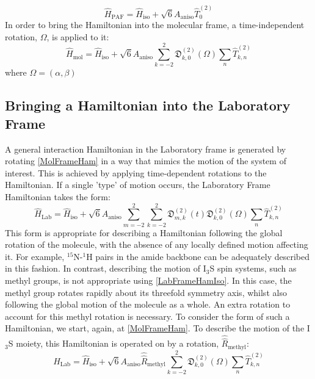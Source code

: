 \begin{equation}
\hat{H}_{\text{PAF}} = \hat{H}_{\text{iso}} + \sqrt{6} A_{\text{aniso}}\hat{T}_0^{(2)}
\end{equation}
In order to bring the Hamiltonian into the molecular frame, a time-independent rotation, $\Omega$, is applied to it: 
\begin{equation}
\label{MolFrameHam}
\hat{H}_{\text{mol}} = \hat{H}_{\text{iso}} + \sqrt{6} A_{\text{aniso}} \sum \limits_{k = -2}^2 \mathfrak{D}_{k,0}^{(2)}(\Omega) \sum \limits_n \hat{T}_{k,n}^{(2)}
\end{equation}
where $\Omega = (\alpha, \beta)$ 
\subsection{Bringing a Hamiltonian into the Laboratory Frame}
A general interaction Hamiltonian in the Laboratory frame is generated by rotating \ref{MolFrameHam} in a way that mimics the motion of the system of interest. This is achieved by applying time-dependent rotations to the Hamiltonian. If a single 'type' of motion occurs, the Laboratory Frame Hamiltonian takes the form:
\begin{equation}
\label{LabFrameHamIso}
\hat{H}_{\text{Lab}} = \hat{H}_{\text{iso}} + \sqrt{6}A_{\text{aniso}} \sum \limits_{m = -2}^2 \sum \limits_{k = -2}^2  \mathfrak{D}_{m,k}^{(2)}(t) \mathfrak{D}_{k,0}^{(2)} (\Omega) \sum_n\hat{T}_{k,n}^{(2)}
\end{equation}
This form is appropriate for describing a Hamiltonian following the global rotation of the molecule, with the absence of any locally defined motion affecting it. For example, $^{15}$N-$^1$H pairs in the amide backbone can be adequately described in this fashion. In contrast, describing the motion of I$_3$S spin systems, such as methyl groups, is not appropriate using \ref{LabFrameHamIso}. In this case, the methyl group rotates rapidly about its threefold symmetry axis, whilst also following the global motion of the molecule as a whole. An extra rotation to account for this methyl rotation is necessary. To consider the form of such a Hamiltonian, we start, again, at \ref{MolFrameHam}. To describe the motion of the I$_3$S moiety, this Hamiltonian is operated on by a rotation, $\hat{\hat{R}}_{\text{methyl}}$: 
\begin{equation}
\hat{H}_{\text{Lab}} = \hat{H}_{\text{iso}} + \sqrt{6} A_{\text{aniso}} \hat{\hat{R}}_{\text{methyl}} \sum \limits_{k = -2}^2 \mathfrak{D}_{k,0}^{(2)}(\Omega) \sum \limits_n \hat{T}_{k,n}^{(2)}
\end{equation}
